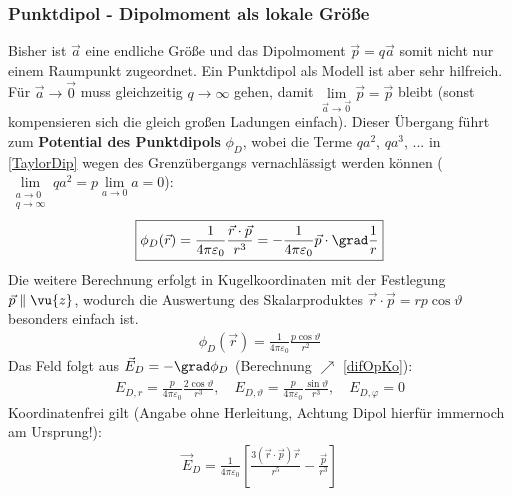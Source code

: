 	  \subsubsection{Punktdipol - Dipolmoment als lokale Größe}
	 Bisher ist $\vec{a}$ eine endliche Größe und das Dipolmoment $\vec{p} = q \vec{a}$ somit nicht nur einem Raumpunkt zugeordnet. Ein Punktdipol als Modell ist aber sehr hilfreich. Für $\vec{a}\to \vec{0}$ muss gleichzeitig $q\to\infty$ gehen, damit $\lim \limits_{\vec{a}\to \vec{0}}\vec{p} =\vec{p}$ bleibt (sonst kompensieren sich die gleich großen Ladungen einfach). Dieser Übergang führt zum \textbf{Potential des Punktdipols} $\phi_D$, wobei die Terme $qa^2$, $qa^3$, ... in \ref{TaylorDip} wegen des Grenzübergangs vernachlässigt werden können ($\lim\limits_{\substack{a\to 0\\q\to\infty}}qa^2=p\lim\limits_{a\to 0} a=0$):
			        \begin{equation}\begin{split}
					        \boxed{\phi_D(\vec{r} ) = \frac{1}{4\pi\varepsilon_0} \frac{\vec{r} \cdot\vec{p}}{r^3} = -\frac{1}{4\pi\varepsilon_0} \vec{p}\cdot\grad \frac{1}{r} }
				        \end{split}\end{equation}
			  Die weitere Berechnung erfolgt in Kugelkoordinaten mit der Festlegung $\vec{p}\parallel\vu{z}$, wodurch die Auswertung des Skalarproduktes $\vec{r} \cdot\vec{p} = r p \cos\vartheta$ besonders einfach ist.
			        \begin{equation}\begin{split}
					        \boxed{\phi_D(\vec{r} ) = \frac{1}{4\pi\varepsilon_0} \frac{p\cos\vartheta}{r^2} }
				        \end{split}\end{equation}
			  Das Feld folgt aus $\vec{E}_D = -\grad \phi_D $ (Berechnung $\nearrow$ \ref{difOpKo}):
			        \begin{equation}\begin{split}
					        \boxed{E_{D,r} = \frac{p}{4\pi\varepsilon_0} \frac{2\cos\vartheta}{r^3}, \quad E_{D,\vartheta} = \frac{p}{4\pi\varepsilon_0} \frac{\sin\vartheta}{r^3}, \quad E_{D,\varphi} = 0 }
				        \end{split}\end{equation}
			  Koordinatenfrei gilt (Angabe ohne Herleitung, Achtung Dipol hierfür immernoch am Ursprung!):
			        \begin{equation}\begin{split}
					        \boxed{\vec{E}_{D} = \frac{1}{4\pi\varepsilon_0}\left[ \frac{3(\vec{r} \cdot\vec{p}) \vec{r} }{r^5} -\frac{\vec{p}}{r^3} \right]}
				        \end{split}\end{equation}
